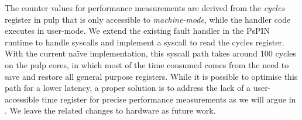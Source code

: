 The counter values for performance measurements are derived from the \emph{cycles} register in \ac{pulp} that is only accessible to \emph{machine-mode}, while the handler code executes in user-mode.  We extend the existing fault handler in the PsPIN runtime to handle syscalls and implement a syscall to read the cycles register.  With the current na\"ive implementation, this syscall path takes around 100 cycles on the \ac{pulp} cores, in which most of the time consumed comes from the need to save and restore all general purpose registers.  While it is possible to optimise this path for a lower latency, a proper solution is to address the lack of a user-accessible time register for precise performance measurements as we will argue in .  We leave the related changes to hardware as future work.
